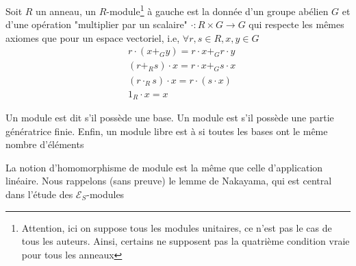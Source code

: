 \documentclass[memoire.tex]{subfiles}
\begin{document}
\begin{definition}
    Soit $R$ un anneau, un $R$-module\footnote{Attention, ici on suppose tous les modules unitaires, ce n'est pas le cas de tous les auteurs. Ainsi, certains ne supposent pas la quatrième condition vraie pour tous les anneaux} à gauche est la donnée d'un groupe abélien $G$ et d'une opération "multiplier par un scalaire" $\cdot:R\times G\rightarrow G$ qui respecte les mêmes axiomes que pour un espace vectoriel, i.e, $\forall r,s\in R,x,y\in G$
    \begin{align*}
        &r\cdot(x+_{G}y)= r\cdot x+_{G}r\cdot y\\
        &(r+_{R} s)\cdot x = r\cdot x+_{G} s\cdot x\\
        &(r\cdot_{R}s)\cdot x=r\cdot(s\cdot x)\\
        &1_{R}\cdot x =x
    \end{align*}
\end{definition}

\begin{definition}
    Un module est dit  s'il possède une base. Un module est  s'il possède une partie génératrice finie. Enfin, un module libre est à  si toutes les bases ont le même nombre d'éléments
\end{definition}

La notion d'homomorphisme de module est la même 
que celle d'application linéaire.
Nous rappelons (sans preuve) le lemme de Nakayama, qui est 
central dans l'étude des $\mathcal{E}_S$-modules 
\end{document}
